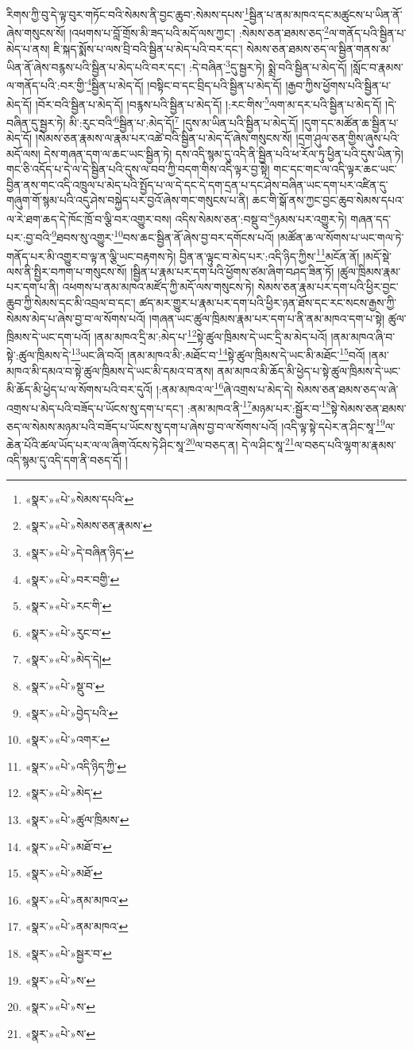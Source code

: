 རིགས་ཀྱི་བུ་དེ་ལྟ་བུར་གཏོང་བའི་སེམས་ནི་བྱང་ཆུབ་:སེམས་དཔས་\footnote{«སྣར་»«པེ་»སེམས་དཔའི་}སྦྱིན་པ་ནམ་མཁའ་དང་མཚུངས་པ་ཡིན་ནོ་ཞེས་གསུངས་སོ། །འཕགས་པ་བློ་གྲོས་མི་ཟད་པའི་མདོ་ལས་ཀྱང་། :སེམས་ཅན་ཐམས་ཅད་\footnote{«སྣར་»«པེ་»སེམས་ཅན་རྣམས་}ལ་གནོད་པའི་སྦྱིན་པ་མེད་པ་ནས། ཇི་སྐད་སྨོས་པ་ལས་བྲི་བའི་སྦྱིན་པ་མེད་པའི་བར་དང་། སེམས་ཅན་ཐམས་ཅད་ལ་སྦྱིན་གནས་མ་ཡིན་ནོ་ཞེས་བརྙས་པའི་སྦྱིན་པ་མེད་པའི་བར་དང་། :དེ་བཞིན་\footnote{«སྣར་»«པེ་»དེ་བཞིན་ཉིད་}དུ་སྦྱར་ཏེ། སྨྲེ་བའི་སྦྱིན་པ་མེད་དོ། །སློང་བ་རྣམས་ལ་གནོད་པའི་:བར་གྱི་\footnote{«སྣར་»«པེ་»བར་བགྱི་}སྦྱིན་པ་མེད་དོ། །བསྟིང་བ་དང་བྲིད་པའི་སྦྱིན་པ་མེད་དོ། །རྒྱབ་ཀྱིས་ཕྱོགས་པའི་སྦྱིན་པ་མེད་དོ། །བོར་བའི་སྦྱིན་པ་མེད་དོ། །བརྙས་པའི་སྦྱིན་པ་མེད་དོ། །:རང་གིས་\footnote{«སྣར་»«པེ་»རང་གི་}ལག་མ་དར་པའི་སྦྱིན་པ་མེད་དོ། །དེ་བཞིན་དུ་སྦྱར་ཏེ། མི་:རུང་བའི་\footnote{«སྣར་»«པེ་»རུང་བ་}སྦྱིན་པ་:མེད་དོ།\footnote{«སྣར་»«པེ་»མེད་དེ།} །དུས་མ་ཡིན་པའི་སྦྱིན་པ་མེད་དོ། །དུག་དང་མཚོན་ཆ་སྦྱིན་པ་མེད་དོ། །སེམས་ཅན་རྣམས་ལ་རྣམ་པར་འཚེ་བའི་སྦྱིན་པ་མེད་དོ་ཞེས་གསུངས་སོ། །དྲག་ཤུལ་ཅན་གྱིས་ཞུས་པའི་མདོ་ལས། དེས་གཞན་དག་ལ་ཆང་ཡང་སྦྱིན་ཏེ། དས་འདི་སྙམ་དུ་འདི་ནི་སྦྱིན་པའི་ཕ་རོལ་ཏུ་ཕྱིན་པའི་དུས་ཡིན་ཏེ། གང་ཅི་འདོད་པ་དེ་ལ་དེ་སྦྱིན་པའི་དུས་ལ་བབ་ཀྱི་བདག་གིས་འདི་ལྟར་བྱ་སྟེ། གང་དང་གང་ལ་འདི་ལྟར་ཆང་ཡང་བྱིན་ནས་གང་འདི་འཁྲུལ་པ་མེད་པའི་སྤྱོད་པ་ལ་དེ་དང་དེ་དག་དྲན་པ་དང་ཤེས་བཞིན་ཡང་དག་པར་འཛིན་དུ་གཞུག་གོ་སྙམ་པའི་འདུ་ཤེས་བསྐྱེད་པར་བྱའོ་ཞེས་གང་གསུངས་པ་ནི། ཆང་གི་སྒོ་ནས་ཀྱང་བྱང་ཆུབ་སེམས་དཔའ་ལ་རེ་ཐག་ཆད་དེ་ཁོང་ཁྲོ་བ་ལྕི་བར་འགྱུར་བས། འདིས་སེམས་ཅན་:བསྡུ་བ་\footnote{«སྣར་»«པེ་»སྡུ་བ་}ཉམས་པར་འགྱུར་ཏེ། གཞན་དད་པར་:བྱ་བའི་\footnote{«སྣར་»«པེ་»བྱེད་པའི་}ཐབས་སུ་འགྱུར་\footnote{«སྣར་»«པེ་»འགར་}བས་ཆང་སྦྱིན་ནོ་ཞེས་བྱ་བར་དགོངས་པའོ། །མཚོན་ཆ་ལ་སོགས་པ་ཡང་གལ་ཏེ་གནོད་པར་མི་འགྱུར་བ་ལྟ་ན་ལྕི་ཡང་བརྟགས་ཏེ། བྱིན་ན་ལྟུང་བ་མེད་པར་:འདི་ཉིད་ཀྱིས་\footnote{«སྣར་»«པེ་»འདི་ཉིད་ཀྱི་}མངོན་ནོ། །མདོ་སྡེ་ལས་ནི་སྤྱིར་བཀག་པ་གསུངས་སོ། །སྦྱིན་པ་རྣམ་པར་དག་པའི་ཕྱོགས་ཙམ་ཞིག་བཤད་ཟིན་ཏོ། །ཚུལ་ཁྲིམས་རྣམ་པར་དག་པ་ནི། འཕགས་པ་ནམ་མཁའ་མཛོད་ཀྱི་མདོ་ལས་གསུངས་ཏེ། སེམས་ཅན་རྣམ་པར་དག་པའི་ཕྱིར་བྱང་ཆུབ་ཀྱི་སེམས་དང་མི་འབྲལ་བ་དང་། ཚད་མར་གྱུར་པ་རྣམ་པར་དག་པའི་ཕྱིར་ཉན་ཐོས་དང་རང་སངས་རྒྱས་ཀྱི་སེམས་མེད་པ་ཞེས་བྱ་བ་ལ་སོགས་པའོ། །གཞན་ཡང་ཚུལ་ཁྲིམས་རྣམ་པར་དག་པ་ནི་ནམ་མཁའ་དག་པ་སྟེ། ཚུལ་ཁྲིམས་དེ་ཡང་དག་པའོ། །ནམ་མཁའ་དྲི་མ་:མེད་པ་\footnote{«སྣར་»«པེ་»མེད་}སྟེ་ཚུལ་ཁྲིམས་དེ་ཡང་དྲི་མ་མེད་པའོ། །ནམ་མཁའ་ཞི་བ་སྟེ་:ཚུལ་ཁྲིམས་དེ་\footnote{«སྣར་»«པེ་»ཚུལ་ཁྲིམས་}ཡང་ཞི་བའོ། །ནམ་མཁའ་མི་:མཐོང་བ་\footnote{«སྣར་»«པེ་»མཐོ་བ་}སྟེ་ཚུལ་ཁྲིམས་དེ་ཡང་མི་མཐོང་\footnote{«སྣར་»«པེ་»མཐོ་}བའོ། །ནམ་མཁའ་མི་དམའ་བ་སྟེ་ཚུལ་ཁྲིམས་དེ་ཡང་མི་དམའ་བ་ནས། ནམ་མཁའ་མི་ཆོད་མི་ཕྱེད་པ་སྟེ་ཚུལ་ཁྲིམས་དེ་ཡང་མི་ཆོད་མི་ཕྱེད་པ་ལ་སོགས་པའི་བར་དུའོ། །:ནམ་མཁའ་ལ་\footnote{«སྣར་»«པེ་»ནམ་མཁའ་}ཞེ་འགྲས་པ་མེད་དེ། སེམས་ཅན་ཐམས་ཅད་ལ་ཞེ་འགྲས་པ་མེད་པའི་བཟོད་པ་ཡོངས་སུ་དག་པ་དང་། :ནམ་མཁའ་ནི་\footnote{«སྣར་»«པེ་»ནམ་མཁའ་}མཉམ་པར་:སྦྱོར་བ་\footnote{«སྣར་»«པེ་»སྦྱར་བ་}སྟེ་སེམས་ཅན་ཐམས་ཅད་ལ་སེམས་མཉམ་པའི་བཟོད་པ་ཡོངས་སུ་དག་པ་ཞེས་བྱ་བ་ལ་སོགས་པའོ། །འདི་ལྟ་སྟེ་དཔེར་ན་ཤིང་སཱ་\footnote{«སྣར་»«པེ་»ས་}ལ་ཆེན་པོའི་ཚལ་ཡོད་པར་ལ་ལ་ཞིག་འོངས་ཏེ་ཤིང་སཱ་\footnote{«སྣར་»«པེ་»ས་}ལ་བཅད་ན། དེ་ལ་ཤིང་སཱ་\footnote{«སྣར་»«པེ་»ས་}ལ་བཅད་པའི་ལྷག་མ་རྣམས་འདི་སྙམ་དུ་འདི་དག་ནི་བཅད་དོ། །
